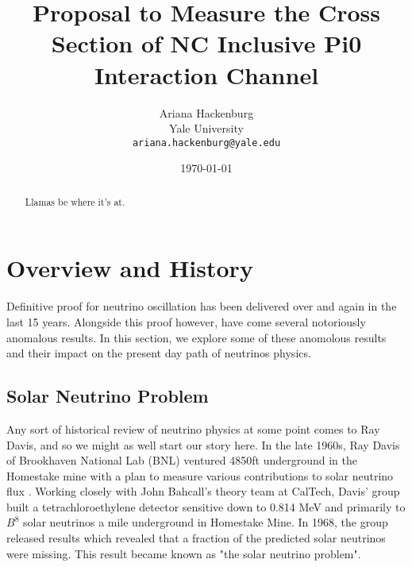 \documentclass[12pt]{article}
\begin{document}
\title{Proposal to Measure the Cross Section of NC Inclusive Pi0 Interaction Channel }
\author{Ariana Hackenburg  \\Yale University \\ 
			\texttt{ariana.hackenburg@yale.edu}}
\date{\today}
\maketitle

\renewcommand{\abstractname}{Abstract}
\begin{abstract}
Llamas be where it's at.
\end{abstract}

\clearpage

\tableofcontents
\listoffigures
\listoftables
\setcounter{tocdepth}{3} 

\clearpage

\section{Overview and History}

Definitive proof for neutrino oscillation has been delivered over and again in the last 15 years. Alongside this proof however, have come several notoriously anomalous results. In this section, we explore some of these anomolous results and their impact on the present day path of neutrinos physics. 
\subsection{Solar Neutrino Problem}
Any sort of historical review of neutrino physics at some point comes to Ray Davis, and so we might as well start our story here.  In the late 1960s, Ray Davis of Brookhaven National Lab (BNL) ventured 4850ft underground in the Homestake mine with a plan to measure various contributions to solar neutrino flux \cite{ray0}. Working closely with John Bahcall's theory team at CalTech, Davis' group built a tetrachloroethylene detector sensitive down to 0.814 MeV and primarily to $B^8$ solar neutrinos\cite{ray0} a mile underground in Homestake Mine. In 1968, the group released results which revealed that a fraction of the predicted solar neutrinos were missing. This result became known as "the solar neutrino problem".
\end{document}
